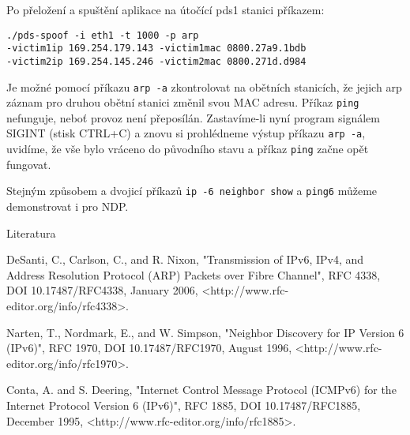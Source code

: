 \documentclass[a4paper, 11pt]{article}
\begin{document}
\par{Po přeložení a spuštění aplikace na útočící pds1 stanici příkazem:}
\begin{Verbatim}
./pds-spoof -i eth1 -t 1000 -p arp 
-victim1ip 169.254.179.143 -victim1mac 0800.27a9.1bdb 
-victim2ip 169.254.145.246 -victim2mac 0800.271d.d984
\end{Verbatim}

\par{Je možné pomocí příkazu \texttt{arp \--a} zkontrolovat na obětních stanicích, že jejich arp záznam pro druhou obětní stanici změnil svou MAC adresu. Příkaz \texttt{ping} nefunguje, neboť provoz není přeposílán. Zastavíme-li nyní program signálem SIGINT (stisk CTRL+C) a znovu si prohlédneme výstup příkazu \texttt{arp \--a}, uvidíme, že vše bylo vráceno do původního stavu a příkaz \texttt{ping} začne opět fungovat.}

\par{Stejným způsobem a dvojicí příkazů \texttt{ip -6 neighbor show} a \texttt{ping6} můžeme demonstrovat i pro NDP.}

\newpage
\Huge{Literatura}
\large

\begin{enumerate}[label={[\arabic*]}]

	\item DeSanti, C., Carlson, C., and R. Nixon, "Transmission of IPv6, IPv4, and Address Resolution Protocol (ARP) Packets over Fibre Channel", RFC 4338, DOI 10.17487/RFC4338, January 2006, <http://www.rfc-editor.org/info/rfc4338>.

	\item Narten, T., Nordmark, E., and W. Simpson, "Neighbor Discovery for IP Version 6 (IPv6)", RFC 1970, DOI 10.17487/RFC1970, August 1996, <http://www.rfc-editor.org/info/rfc1970>.

	\item Conta, A. and S. Deering, "Internet Control Message Protocol (ICMPv6) for the Internet Protocol Version 6 (IPv6)", RFC 1885, DOI 10.17487/RFC1885, December 1995, <http://www.rfc-editor.org/info/rfc1885>.

\end{enumerate}
\end{document}
